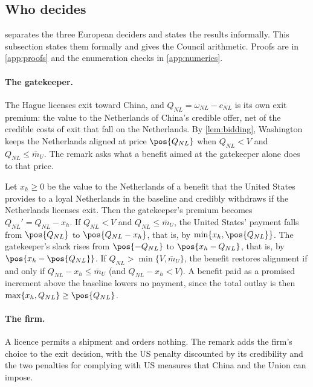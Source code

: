 \subsection{Who decides}\label{app:decide}

 separates the three European deciders and states the results informally. This subsection states them formally and gives the Council arithmetic. Proofs are in \cref{app:proofs} and the enumeration checks in \cref{app:numerics}.

\paragraph{The gatekeeper.} The Hague licenses exit toward China, and $Q_{NL}=\omega_{NL}-c_{NL}$ is its own exit premium: the value to the Netherlands of China's credible offer, net of the credible costs of exit that fall on the Netherlands. By \cref{lem:bidding}, Washington keeps the Netherlands aligned at price $\pos{Q_{NL}}$ when $Q_{NL}<V$ and $Q_{NL}\le\bar m_U$. The remark asks what a benefit aimed at the gatekeeper alone does to that price.

\begin{remark}[Gatekeeper]\label{rem:gatekeeper}
Let $x_h\ge0$ be the value to the Netherlands of a benefit that the United States provides to a loyal Netherlands in the baseline and credibly withdraws if the Netherlands licenses exit. Then the gatekeeper's premium becomes $Q_{NL}'=Q_{NL}-x_h$. If $Q_{NL}<V$ and $Q_{NL}\le\bar m_U$, the United States' payment falls from $\pos{Q_{NL}}$ to $\pos{Q_{NL}-x_h}$, that is, by $\min\{x_h,\pos{Q_{NL}}\}$. The gatekeeper's slack rises from $\pos{-Q_{NL}}$ to $\pos{x_h-Q_{NL}}$, that is, by $\pos{x_h-\pos{Q_{NL}}}$. If $Q_{NL}>\min\{V,\bar m_U\}$, the benefit restores alignment if and only if $Q_{NL}-x_h\le\bar m_U$ (and $Q_{NL}-x_h<V$). A benefit paid as a promised increment above the baseline lowers no payment, since the total outlay is then $\max\{x_h,Q_{NL}\}\ge\pos{Q_{NL}}$.
\end{remark}

\paragraph{The firm.} A licence permits a shipment and orders nothing. The remark adds the firm's choice to the exit decision, with the US penalty discounted by its credibility and the two penalties for complying with US measures that China and the Union can impose.

